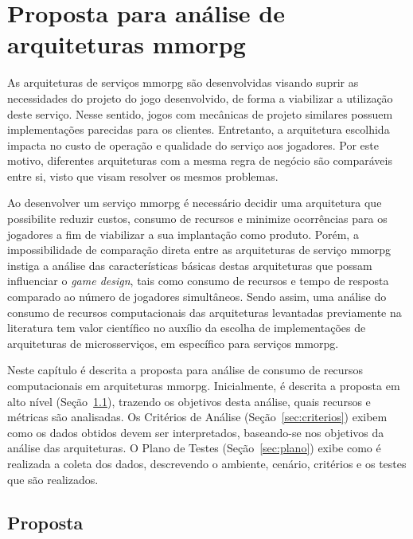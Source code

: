 \chapter{Proposta para análise de arquiteturas \ac{mmorpg}}
\label{cap3}


As arquiteturas de serviços \ac{mmorpg} são desenvolvidas visando suprir as necessidades do projeto do jogo desenvolvido, de forma a viabilizar a utilização deste serviço.
%
Nesse sentido, jogos com mecânicas de projeto similares possuem implementações parecidas para os clientes.
%
Entretanto, a arquitetura escolhida impacta no custo de operação e qualidade do serviço aos jogadores.
%
Por este motivo, diferentes arquiteturas com a mesma regra de negócio são comparáveis entre si, visto que visam resolver os mesmos problemas.



Ao desenvolver um serviço \ac{mmorpg} é necessário decidir uma arquitetura que possibilite reduzir custos, consumo de recursos e minimize ocorrências para os jogadores a fim de viabilizar a sua implantação como produto.
%
Porém, a impossibilidade de comparação direta entre as arquiteturas de serviço \ac{mmorpg} instiga a análise das características básicas destas arquiteturas que possam influenciar o \textit{game design}, tais como consumo de recursos e tempo de resposta comparado ao número de jogadores simultâneos.
%
Sendo assim, uma análise do consumo de recursos computacionais das arquiteturas levantadas previamente na literatura tem valor científico no auxílio da escolha de implementações de arquiteturas de microsserviços, em específico para serviços \ac{mmorpg}.



Neste capítulo é descrita a proposta para análise de consumo de recursos computacionais em arquiteturas \ac{mmorpg}.
%
Inicialmente, é descrita a proposta em alto nível (Seção~\ref{sec:proposta}), trazendo os objetivos desta análise, quais recursos e métricas são analisadas.
%
Os Critérios de Análise (Seção~\ref{sec:criterios}) exibem como os dados obtidos devem ser interpretados, baseando-se nos objetivos da análise das arquiteturas.
%
O Plano de Testes (Seção~\ref{sec:plano}) exibe como é realizada a coleta dos dados, descrevendo o ambiente, cenário, critérios e os testes que são realizados.

\section{Proposta}
\label{sec:proposta}

